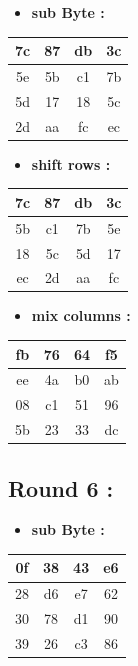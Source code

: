 \documentclass{article}
\begin{document}
\begin{itemize}
    \item \textbf{sub Byte :}
\end{itemize} \begin{tabular}{|c|c|c|c|}
\hline 7c & 87 & db & 3c \\ \hline 5e & 5b & c1 & 7b \\ \hline 5d & 17 & 18 & 5c \\ \hline 2d & aa & fc & ec \\ \hline \end{tabular}\hspace{0.5cm}\vspace{0.1cm}\begin{itemize}
    \item \textbf{shift rows :}
\end{itemize} \begin{tabular}{|c|c|c|c|}
\hline 7c & 87 & db & 3c \\ \hline 5b & c1 & 7b & 5e \\ \hline 18 & 5c & 5d & 17 \\ \hline ec & 2d & aa & fc \\ \hline \end{tabular}\hspace{0.5cm}\vspace{0.1cm}\begin{itemize}
    \item \textbf{mix columns :}
\end{itemize} \begin{tabular}{|c|c|c|c|}
\hline fb & 76 & 64 & f5 \\ \hline ee & 4a & b0 & ab \\ \hline 08 & c1 & 51 & 96 \\ \hline 5b & 23 & 33 & dc \\ \hline \end{tabular}\hspace{0.5cm}\vspace{0.1cm}\subsection*{Round 6 : }\begin{itemize}
    \item \textbf{sub Byte :}
\end{itemize} \begin{tabular}{|c|c|c|c|}
\hline 0f & 38 & 43 & e6 \\ \hline 28 & d6 & e7 & 62 \\ \hline 30 & 78 & d1 & 90 \\ \hline 39 & 26 & c3 & 86 \\ \hline \end{tabular}\hspace{0.5cm}\vspace{0.1cm}\begin{itemize}

\end{itemize}
\end{document}
